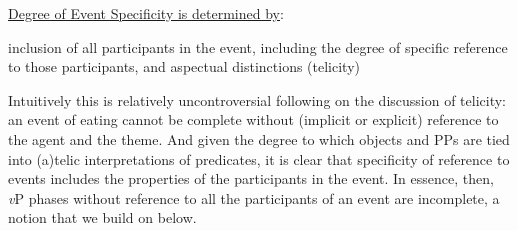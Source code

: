\ea \underline{Degree of Event Specificity is determined by}:

\begin{xlist}
\ex inclusion of all participants in the event, including \label{IncludeParticipants}
\ex the degree of specific reference to those participants, and \label{}
\ex aspectual distinctions (telicity)
\end{xlist}

\z

Intuitively this is relatively uncontroversial following on the discussion of telicity: an event of eating cannot be complete without (implicit or explicit) reference to the agent and the theme. And given the degree to which objects and PPs are tied into (a)telic interpretations of predicates, it is clear that specificity of reference to events includes the properties of the participants in the event. In essence, then, \textit{v}P phases without reference to all the participants of an event are incomplete, a notion that we build on below.

